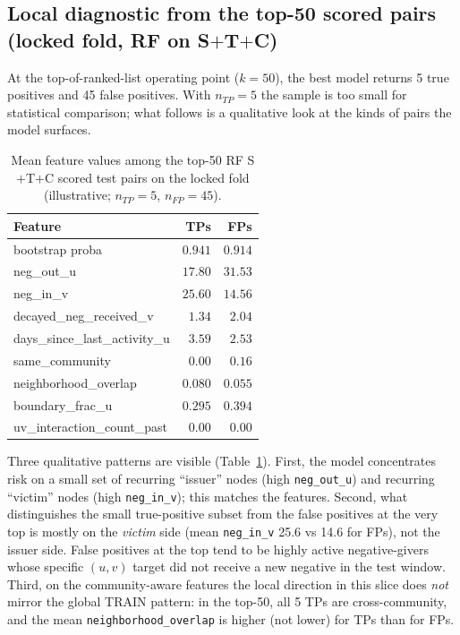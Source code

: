 \documentclass[conference]{IEEEtran}
\newcommand{\code}[1]{\texttt{#1}}
\begin{document}
\subsection{Local diagnostic from the top-50 scored pairs (locked
fold, RF on S$+$T$+$C)}

At the top-of-ranked-list operating point ($k = 50$), the best model
returns 5 true positives and 45 false positives. With $n_{TP} = 5$ the
sample is too small for statistical comparison; what follows is a
qualitative look at the kinds of pairs the model surfaces.

\begin{table}[t]
\caption{Mean feature values among the top-50 RF S$+$T$+$C scored
test pairs on the locked fold (illustrative; $n_{TP} = 5$, $n_{FP} = 45$).}
\label{tab:top50}
\centering
\small
\begin{tabular}{lrr}
\toprule
Feature & TPs & FPs \\
\midrule
bootstrap proba              & $0.941$ & $0.914$ \\
neg\_out\_u                  & $17.80$ & $31.53$ \\
neg\_in\_v                   & $25.60$ & $14.56$ \\
decayed\_neg\_received\_v    & $1.34$  & $2.04$  \\
days\_since\_last\_activity\_u & $3.59$ & $2.53$ \\
same\_community              & $0.00$  & $0.16$  \\
neighborhood\_overlap        & $0.080$ & $0.055$ \\
boundary\_frac\_u            & $0.295$ & $0.394$ \\
uv\_interaction\_count\_past & $0.00$  & $0.00$  \\
\bottomrule
\end{tabular}
\end{table}

Three qualitative patterns are visible
(Table~\ref{tab:top50}). First, the model concentrates risk on a
small set of recurring ``issuer'' nodes (high \code{neg\_out\_u}) and
recurring ``victim'' nodes (high \code{neg\_in\_v}); this matches the
features. Second, what distinguishes the small true-positive subset
from the false positives at the very top is mostly on the
\emph{victim} side (mean \code{neg\_in\_v} 25.6 vs 14.6 for FPs), not
the issuer side. False positives at the top tend to be highly active
negative-givers whose specific $(u, v)$ target did not receive a new
negative in the test window. Third, on the community-aware features
the local direction in this slice does \emph{not} mirror the global
TRAIN pattern: in the top-50, all 5 TPs are cross-community, and the
mean \code{neighborhood\_overlap} is higher (not lower) for TPs than
for FPs.
\end{document}
